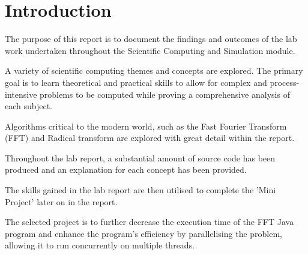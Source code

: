\chapter{Introduction}
The purpose of this report is to document the findings and outcomes of the lab work undertaken throughout the Scientific Computing and Simulation module.

A variety of scientific computing themes and concepts are explored. The primary goal is to learn theoretical and practical skills to allow for complex and process-intensive problems to be computed while proving a comprehensive analysis of each subject.

Algorithms critical to the modern world, such as the Fast Fourier Transform (FFT) and Radical transform are explored with great detail within the report. 

Throughout the lab report, a substantial amount of source code has been produced and an explanation for each concept has been provided.

The skills gained in the lab report are then utilised to complete the 'Mini Project' later on in the report. 

The selected project is to further decrease the execution time of the FFT Java program and enhance the program's efficiency by parallelising the problem, allowing it to run concurrently on multiple threads. 


